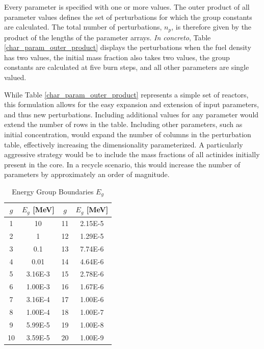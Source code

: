 Every parameter is specified with one or more values.  The outer product of all parameter
values defines the set of perturbations for which the group constants are calculated.
The total number of perturbations, $n_p$, is therefore given by the product of 
the lengths of the parameter arrays.  \emph{In concreto}, Table \ref{char_param_outer_product} 
displays the perturbations when the fuel density has two values, the initial  mass 
fraction also takes two values, the group constants are calculated at five burn steps, and all 
other parameters are single valued.

While Table \ref{char_param_outer_product} represents a simple set of reactors, this formulation 
allows for the easy expansion and extension of input parameters, and thus new perturbations. 
Including additional values for any parameter would extend the number of rows in the table.  
Including other parameters, such as initial  concentration, would expand the number of
columns in the perturbation table, effectively increasing the dimensionality parameterized.
A particularly aggressive strategy would be to include the mass fractions of all actinides initially
present in the core.  In a recycle scenario, this would increase the number of parameters by 
approximately an order of magnitude.  

\begin{table}[htbp]
\begin{center}
\caption{Energy Group Boundaries $E_g$}
\label{group_boundaries}
\begin{tabular}{|c|c||c|c|}
\hline
\textbf{$g$} & \textbf{$E_g$ [MeV]} & \textbf{$g$} & \textbf{$E_g$ [MeV]} \\
\hline
1  & 10      & 11 & 2.15E-5 \\ 
2  & 1       & 12 & 1.29E-5 \\ 
3  & 0.1     & 13 & 7.74E-6 \\
4  & 0.01    & 14 & 4.64E-6 \\
5  & 3.16E-3 & 15 & 2.78E-6 \\
6  & 1.00E-3 & 16 & 1.67E-6 \\
7  & 3.16E-4 & 17 & 1.00E-6 \\
8  & 1.00E-4 & 18 & 1.00E-7 \\
9  & 5.99E-5 & 19 & 1.00E-8 \\
10 & 3.59E-5 & 20 & 1.00E-9 \\
\hline
\end{tabular}
\end{center}
\end{table}

